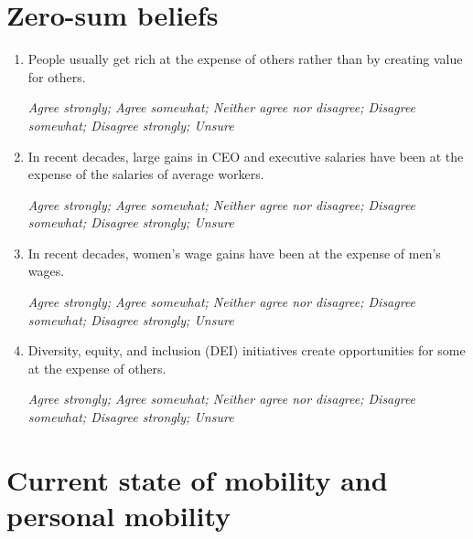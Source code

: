 \documentclass[11pt, headsepline]{article}
\begin{document}
\section*{Zero-sum beliefs}

\begin{enumerate}[resume]

    \item People usually get rich at the expense of others rather than by creating value for others.

    \textit{Agree strongly; Agree somewhat; Neither agree nor disagree; Disagree somewhat; Disagree strongly; Unsure}

    \item In recent decades, large gains in CEO and executive salaries have been at the expense of the salaries of average workers.

    \textit{Agree strongly; Agree somewhat; Neither agree nor disagree; Disagree somewhat; Disagree strongly; Unsure}

    \item In recent decades, women’s wage gains have been at the expense of men’s wages.

    \textit{Agree strongly; Agree somewhat; Neither agree nor disagree; Disagree somewhat; Disagree strongly; Unsure}

    \item Diversity, equity, and inclusion (DEI) initiatives create opportunities for some at the expense of others.

    \textit{Agree strongly; Agree somewhat; Neither agree nor disagree; Disagree somewhat; Disagree strongly; Unsure}
    
\end{enumerate}

\section*{Current state of mobility and personal mobility}
\end{document}

